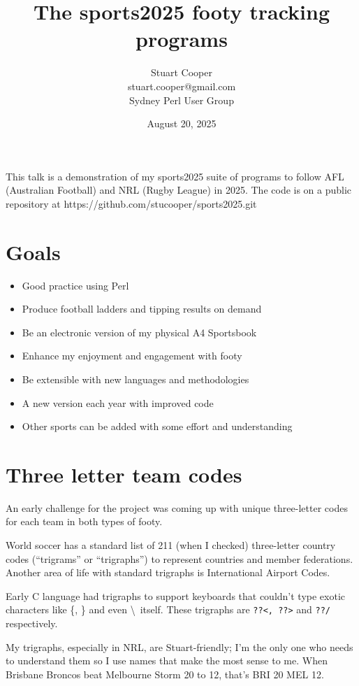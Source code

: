 \documentclass{article}
\title{The sports2025 footy tracking programs}
\author{Stuart Cooper\\stuart.cooper@gmail.com\\Sydney Perl User Group}
\date{August 20, 2025}
\begin{document}
\maketitle

This talk is a demonstration of my sports2025 suite of programs to
follow AFL (Australian Football) and NRL (Rugby League) in 2025.
The code is on a public repository at
https://github.com/stucooper/sports2025.git

\section{Goals}

\begin{itemize}
  \item Good practice using Perl
  \item Produce football ladders and tipping results on demand
  \item Be an electronic version of my physical A4 Sportsbook
  \item Enhance my enjoyment and engagement with footy
  \item Be extensible with new languages and methodologies
  \item A new version each year with improved code
  \item Other sports can be added with some effort and understanding
\end{itemize}

\section{Three letter team codes}

An early challenge for the project was coming up with unique
three-letter codes for each team in both types of footy.

World soccer has a standard list of 211 (when I checked) three-letter
country codes (``trigrams'' or ``trigraphs'') to represent countries
and member federations. Another area of life with standard trigraphs
is International Airport Codes.

Early C language had trigraphs to support keyboards that couldn't type
exotic characters like \{, \} and even \textbackslash\ itself. These
trigraphs are \verb!??<, ??>! and \verb!??/! respectively.

My trigraphs, especially in NRL, are Stuart-friendly; I'm the only one
who needs to understand them so I use names that make the most sense
to me. When Brisbane Broncos beat Melbourne Storm 20 to 12, that's BRI
20 MEL 12.
\end{document}
